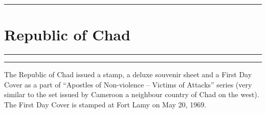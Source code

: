 \documentclass[a4paper]{article}
\begin{document}
  \hrule
\section*{Republic of Chad}
\vspace{8pt}
\hrule
\vspace{14cm}
\hfill
\begin{minipage}{6cm}
  \hrule \vspace{12pt} The Republic of Chad issued a stamp, a deluxe
  souvenir sheet and a First Day Cover as a part of ``Apostles of
  Non-violence -- Victims of Attacks'' series (very similar to the set
  issued by Cameroon a neighbour country of Chad on the west). The
  First Day Cover is stamped at Fort Lamy on May 20, 1969.
\end{minipage}

\end{document}
